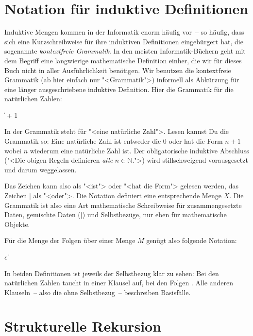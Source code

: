 \section{Notation für induktive Definitionen}

Induktive Mengen kommen in der Informatik enorm häufig vor~-- so
häufig, dass sich eine Kurzschreibweise für ihre induktiven
Definitionen eingebürgert hat, die sogenannte \textit{kontextfreie
  Grammatik}.  In den
meisten Informatik-Büchern geht mit dem Begriff eine langwierige
mathematische Definition einher, die wir für dieses Buch nicht in aller
Ausführlichkeit benötigen.  Wir benutzen die kontextfreie Grammatik
(ab hier einfach nur "<Grammatik">) informell als Abkürzung für
eine länger ausgeschriebene induktive Definition.  Hier die Grammatik
für die natürlichen Zahlen:
%
\begin{grammar}
    \|  + 1
\end{grammar}
%
In der Grammatik steht  für "<eine natürliche
Zahl">.  Lesen kannst Du die Grammatik so: Eine natürliche Zahl ist
entweder die $0$ oder hat die Form $n + 1$ wobei $n$ wiederum eine
natürliche Zahl ist.  Der obligatorische induktive Abschluss ("<Die
obigen Regeln definieren \emph{alle} $n\in\mathbb{N}$.">) wird
stillschweigend vorausgesetzt
und darum weggelassen.  

Das Zeichen \goesto{} kann also als "<ist"> oder "<hat die Form">
gelesen werden, das Zeichen $\vert$ als "<oder">. Die Notation
 definiert eine entsprechende Menge $X$.  Die Grammatik ist
also eine Art mathematische Schreibweise für zusammengesetzte Daten,
gemischte Daten ($\vert$) und Selbstbezüge, nur eben für mathematische
Objekte.

Für die Menge der Folgen über einer Menge $M$ genügt also folgende Notation:
%
\begin{grammar}
   \: $\epsilon$ \|  
\end{grammar}
%
In beiden Definitionen ist jeweils der Selbstbezug klar zu sehen: 
Bei den natürlichen Zahlen taucht   in einer
Klausel auf, bei den Folgen .  Alle anderen Klauseln~--
also die ohne Selbstbezug~-- beschreiben Basisfälle.

\section{Strukturelle Rekursion}

